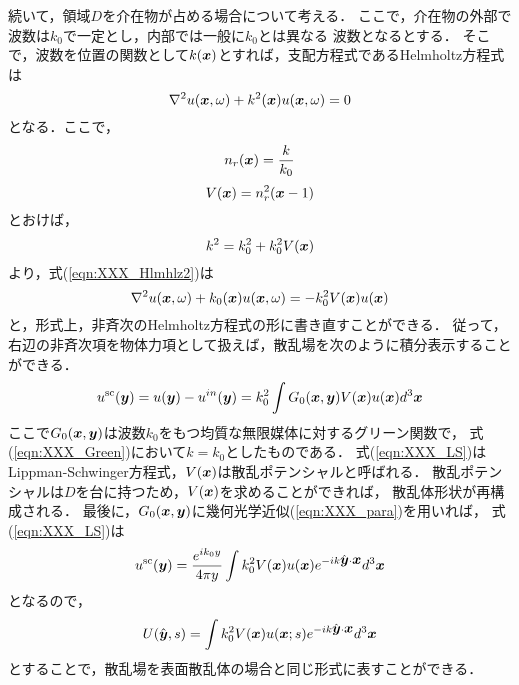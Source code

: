 続いて，領域$D$を介在物が占める場合について考える．
ここで，介在物の外部で波数は$k_0$で一定とし，内部では一般に$k_0$とは異なる
波数となるとする．
そこで，波数を位置の関数として$k(\mbox{\boldmath $x$})$とすれば，支配方程式であるHelmholtz方程式は
\begin{equation}
	\nabla^2 u(\mbox{\boldmath $x$},\omega) + k^2(\mbox{\boldmath $x$}) u(\mbox{\boldmath $x$},\omega) =0
	\label{eqn:Hlmhlz2}
\end{equation}
となる．ここで，
\begin{equation}
	n_r(\mbox{\boldmath $x$}) =\frac{k}{k_0}
	\label{eqn:}
\end{equation}
\begin{equation}
	V(\mbox{\boldmath $x$})=n_r^2(\mbox{\boldmath $x$}-1)
	\label{eqn:}
\end{equation}
とおけば，
\begin{equation}
	k^2=k_0^2 + k_0^2 V(\mbox{\boldmath $x$})
	\label{eqn:}
\end{equation}
より，式(\ref{eqn:XXX_Hlmhlz2})は
\begin{equation}
	\nabla^2 u(\mbox{\boldmath $x$},\omega) + k_0(\mbox{\boldmath $x$}) u(\mbox{\boldmath $x$},\omega) = -k_0^2 V(\mbox{\boldmath $x$})u(\mbox{\boldmath $x$})
	\label{eqn:Hlmhlz3}
\end{equation}
と，形式上，非斉次のHelmholtz方程式の形に書き直すことができる．
従って，右辺の非斉次項を物体力項として扱えば，散乱場を次のように積分表示することができる．
\begin{equation}
	u^{\rm sc}(\mbox{\boldmath $y$})=u(\mbox{\boldmath $y$})-u^{in}(\mbox{\boldmath $y$}) = k_0^2\int G_0(\mbox{\boldmath $x$},\mbox{\boldmath $y$})V(\mbox{\boldmath $x$})u(\mbox{\boldmath $x$}) d^3\mbox{\boldmath $x$}
	\label{eqn:LS}
\end{equation}
ここで$G_0(\mbox{\boldmath $x$},\mbox{\boldmath $y$})$は波数$k_0$をもつ均質な無限媒体に対するグリーン関数で，
式(\ref{eqn:XXX_Green})において$k=k_0$としたものである．
式(\ref{eqn:XXX_LS})はLippman-Schwinger方程式，$V(\mbox{\boldmath $x$})$は散乱ポテンシャルと呼ばれる．
散乱ポテンシャルは$D$を台に持つため，$V(\mbox{\boldmath $x$})$を求めることができれば，
散乱体形状が再構成される．
最後に，$G_0(\mbox{\boldmath $x$},\mbox{\boldmath $y$})$に幾何光学近似(\ref{eqn:XXX_para})を用いれば，
式(\ref{eqn:XXX_LS})は
\begin{equation}
	u^{\rm sc}(\mbox{\boldmath $y$})
	=
	\frac{e^{ik_0y}}{4\pi y}
	\int
	k_0^2 V(\mbox{\boldmath $x$})u(\mbox{\boldmath $x$}) e^{-ik\hat{\mbox{\boldmath $y$}}\cdot \mbox{\boldmath $x$}}d^3\mbox{\boldmath $x$}
	\label{eqn:}
\end{equation}
となるので，
\begin{equation}
	U(\hat{\mbox{\boldmath $y$}},s)
	=
	\int
	k_0^2 V(\mbox{\boldmath $x$})u(\mbox{\boldmath $x$};s) e^{-ik\hat{\mbox{\boldmath $y$}}\cdot \mbox{\boldmath $x$}}d^3\mbox{\boldmath $x$}
	\label{eqn:U_vol}
\end{equation}
とすることで，散乱場を表面散乱体の場合と同じ形式に表すことができる．
%
